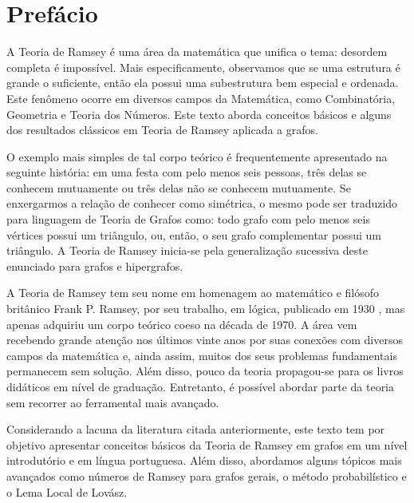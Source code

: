
\chapter{Prefácio}

A Teoria de Ramsey é uma área da matemática que unifica o tema: desordem completa é impossível. Mais especificamente, observamos que se uma estrutura é grande o suficiente, então ela possui uma subestrutura bem especial e ordenada. Este fenômeno ocorre em diversos campos da Matemática, como Combinatória, Geometria e Teoria dos Números. Este texto aborda conceitos básicos e alguns dos resultados clássicos em Teoria de Ramsey aplicada a grafos.

O exemplo mais simples de tal corpo teórico é frequentemente apresentado na seguinte história: em uma festa com pelo menos seis pessoas, três delas se conhecem mutuamente ou três delas não se conhecem mutuamente. Se enxergarmos a relação de conhecer como simétrica, o mesmo pode ser traduzido para linguagem de Teoria de Grafos como: todo grafo com pelo menos seis vértices possui um triângulo, ou, então, o seu grafo complementar possui um triângulo. A Teoria de Ramsey inicia-se pela generalização sucessiva deste enunciado para grafos e hipergrafos.

A Teoria de Ramsey tem seu nome em homenagem ao matemático e filósofo britânico Frank P. Ramsey, por seu trabalho, em lógica, publicado em 1930 \cite{ramsey}, mas apenas adquiriu um corpo teórico coeso na década de 1970. A área vem recebendo grande atenção nos últimos vinte anos por suas conexões com diversos campos da matemática e, ainda assim, muitos dos seus problemas fundamentais permanecem sem solução. Além disso, pouco da teoria propagou-se para os livros didáticos em nível de graduação. Entretanto, é possível abordar parte da teoria sem recorrer ao ferramental mais avançado.

Considerando a lacuna da literatura citada anteriormente, este texto tem por objetivo apresentar conceitos básicos da Teoria de Ramsey em grafos em um nível introdutório e em língua portuguesa. Além disso, abordamos alguns tópicos mais avançados como números de Ramsey para grafos gerais, o método probabilístico e o Lema Local de Lovász.

